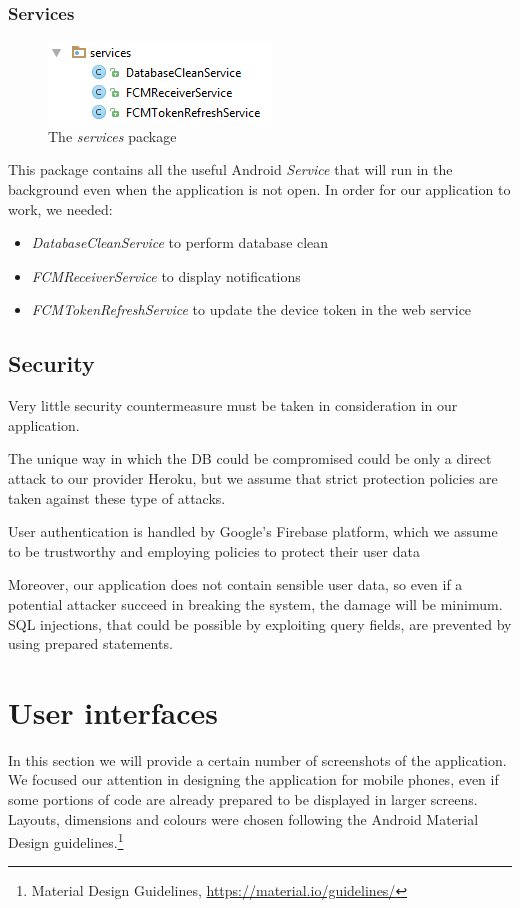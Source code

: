 \documentclass[a4paper]{scrreprt}
\begin{document}
\subsection{Services}
\begin{figure}[H]
	\centering
	\includegraphics{pack_services}
	\caption{The \emph{services} package}
\end{figure}
This package contains all the useful Android \emph{Service} that will run in the background even when the application is not open. In order for our application to work, we needed:
\begin{itemize}
	\item \emph{DatabaseCleanService} to perform database clean
	\item \emph{FCMReceiverService} to display notifications
	\item \emph{FCMTokenRefreshService} to update the device token in the web service
\end{itemize}


\section{Security}
Very little security countermeasure must be taken in consideration in our application.
\par The unique way in which the DB could be compromised could be only a direct attack to our provider Heroku, but we assume that strict protection policies are taken against these type of attacks.
\par User authentication is handled by Google's Firebase platform, which we assume to be trustworthy and employing policies to protect their user data
\par Moreover, our application does not contain sensible user data, so even if a potential attacker succeed in breaking the system, the damage will be minimum. SQL injections, that could be possible by exploiting query fields, are prevented by using prepared statements.



\chapter{User interfaces}
In this section we will provide a certain number of screenshots of the application. We focused our attention in designing the application for mobile phones, even if some portions of code are already prepared to be displayed in larger screens. Layouts, dimensions and colours were chosen following the Android Material Design guidelines.\footnote{Material Design Guidelines, \url{https://material.io/guidelines/}}
\end{document}
